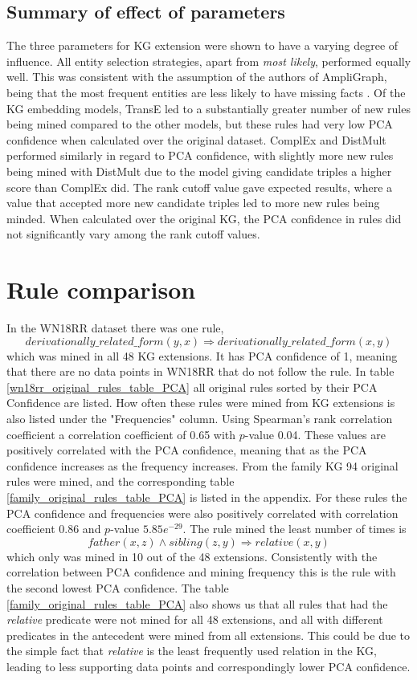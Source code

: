 \subsection{Summary of effect of parameters}
The three parameters for KG extension were shown to have a varying degree of influence. All entity selection strategies, apart from \textit{most likely}, performed equally well. This was consistent with the assumption of the authors of AmpliGraph, being that the most frequent entities are less likely to have missing facts \cite{ampligraph}. Of the KG embedding models, TransE led to a substantially greater number of new rules being mined compared to the other models, but these rules had very low PCA confidence when calculated over the original dataset. ComplEx and DistMult performed similarly in regard to PCA confidence, with slightly more new rules being mined with DistMult due to the model giving candidate triples a higher score than ComplEx did. The rank cutoff value gave expected results, where a value that accepted more new candidate triples led to more new rules being minded. When calculated over the original KG, the PCA confidence in rules did not significantly vary among the rank cutoff values. 

\newpage
\section{Rule comparison}
In the WN18RR dataset there was one rule, 
\[derivationally\_related\_form(y, x) \Rightarrow derivationally\_related\_form(x, y)\]
which was mined in all 48 KG extensions. It has PCA confidence of 1, meaning that there are no data points in WN18RR that do not follow the rule. In table \ref{wn18rr_original_rules_table_PCA} all original rules sorted by their PCA Confidence are listed. How often these rules were mined from KG extensions is also listed under the "Frequencies" column. Using Spearman's rank correlation coefficient a correlation coefficient of 0.65 with $p$-value 0.04. These values are positively correlated with the PCA confidence, meaning that as the PCA confidence increases as the frequency increases. From the family KG 94 original rules were mined, and the corresponding table \ref{family_original_rules_table_PCA} is listed in the appendix. For these rules the PCA confidence and frequencies were also positively correlated with correlation coefficient 0.86 and $p$-value $5.85e^{-29}$. The rule mined the least number of times is
\[father(x,z) \wedge sibling(z, y) \Rightarrow relative(x, y)\]
which only was mined in 10 out of the 48 extensions. Consistently with the correlation between PCA confidence and mining frequency this is the rule with the second lowest PCA confidence. The table \ref{family_original_rules_table_PCA} also shows us that all rules that had the \textit{relative} predicate were not mined for all 48 extensions, and all with different predicates in the antecedent were mined from all extensions. This could be due to the simple fact that \textit{relative} is the least frequently used relation in the KG, leading to less supporting data points and correspondingly lower PCA confidence.



